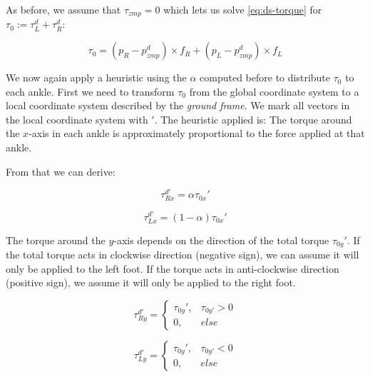 \documentclass[english,ngerman]{KITreprt}
\begin{document}
As before, we assume that $\tau_{zmp} = 0$ which lets us solve
\ref{eq:ds-torque} for $\tau_0 := \tau^d_L + \tau^d_R$:

\begin{equation} \label{eq:tau0-torque}
\tau_0 = (p_R - p^d_{zmp}) \times f_R + (p_L - p^d_{zmp}) \times f_L
\end{equation}

We now again apply a heuristic using the $\alpha$ computed before to
distribute $\tau_0$ to each ankle. First we need to transform $\tau_0$
from the global coordinate system to a local coordinate system described
by the \emph{ground frame}. We mark all vectors in the local coordinate
system with $'$. The heuristic applied is: The torque around the
$x$-axis in each ankle is approximately proportional to the force
applied at that ankle.

\newpage

From that we can derive:

\begin{equation} \label{eq:torque-right-x}
\tau^{d'}_{Rx} = \alpha \tau_{0x}'
\end{equation}

\begin{equation} \label{eq:torque-left-x}
\tau^{d'}_{Lx} = (1-\alpha) \tau_{0x}'
\end{equation}

The torque around the $y$-axis depends on the direction of the total
torque $\tau_{0y}'$. If the total torque acts in clockwise direction
(negative sign), we can assume it will only be applied to the left foot.
If the torque acts in anti-clockwise direction (positive sign), we
assume it will only be applied to the right foot.

\begin{equation} \label{eq:torque-right-x}
\tau^{d'}_{Ry} = \left\{
\begin{array}{lr}
\tau_{0y}', & \tau_{0y'} > 0 \\
0, & else
\end{array}
\right.
\end{equation}

\begin{equation} \label{eq:torque-left-x}
\tau^{d'}_{Ly} = \left\{
\begin{array}{lr}
\tau_{0y}', & \tau_{0y'} < 0 \\
0, & else
\end{array}
\right.
\end{equation}
\end{document}
